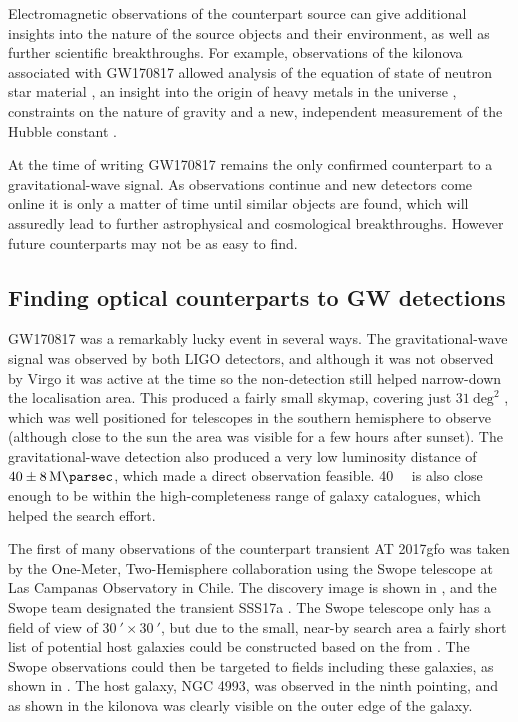 \begin{colsection}
\begin{colsection}
Electromagnetic observations of the counterpart source can give additional insights into the nature of the source objects and their environment, as well as further scientific breakthroughs. For example, observations of the kilonova associated with GW170817 \citep{GW170817, GW170817_followup} allowed analysis of the equation of state of neutron star material \citep{GW170817_NSscience}, an insight into the origin of heavy metals in the universe \citep{GW170818_heavy}, constraints on the nature of gravity \citep{GW170817_gravity} and a new, independent measurement of the Hubble constant \citep{GW170817_hubble}.

At the time of writing GW170817 remains the only confirmed counterpart to a gravitational-wave signal. As observations continue and new detectors come online it is only a matter of time until similar objects are found, which will assuredly lead to further astrophysical and cosmological breakthroughs. However future counterparts may not be as easy to find.

\end{colsection}


\subsection{Finding optical counterparts to GW detections}
\label{sec:followup}
\begin{colsection}

GW170817 was a remarkably lucky event in several ways. The gravitational-wave signal was observed by both LIGO detectors, and although it was not observed by Virgo it was active at the time so the non-detection still helped narrow-down the localisation area. This produced a fairly small skymap, covering just $31~\text{deg}^2$ \citep[see ]{GW170817}, which was well positioned for telescopes in the southern hemisphere to observe (although close to the sun the area was visible for a few hours after sunset). The gravitational-wave detection also produced a very low luminosity distance of $40\pm\SI{8}{\mega\parsec}$, which made a direct observation feasible. \SI{40}{\mega\parsec} is also close enough to be within the high-completeness range of galaxy catalogues, which helped the search effort.

The first of many observations of the counterpart transient AT 2017gfo was taken by the One-Meter, Two-Hemisphere collaboration using the Swope telescope at Las Campanas Observatory in Chile. The discovery image is shown in , and the Swope team designated the transient SSS17a \citep{GW170817_Swope}. The Swope telescope only has a field of view of $\SI{30}{\arcmin}\times\SI{30}{\arcmin}$, but due to the small, near-by search area a fairly short list of potential host galaxies could be constructed based on the  from \citet{GWGC}. The Swope observations could then be targeted to fields including these galaxies, as shown in . The host galaxy, NGC 4993, was observed in the ninth pointing, and as shown in  the kilonova was clearly visible on the outer edge of the galaxy.


\end{colsection}
\end{colsection}
